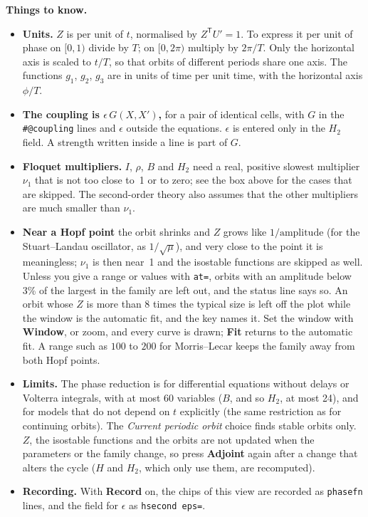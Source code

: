 \documentclass[11pt,a4paper]{article}
\newcommand{\ui}[1]{\textsf{\textbf{#1}}}          %
\begin{document}
\begin{notebox}
\textbf{Things to know.}
\begin{itemize}
  \item \textbf{Units.} $Z$ is per unit of $t$, normalised by $Z^{\mathsf T}U'=1$. To express it per unit of phase on $[0,1)$ divide by $T$; on $[0,2\pi)$ multiply by $2\pi/T$. Only the horizontal axis is scaled to $t/T$, so that orbits of different periods share one axis. The functions $g_1$, $g_2$, $g_3$ are in units of time per unit time, with the horizontal axis $\phi/T$.
  \item \textbf{The coupling is $\epsilon\,G(X,X')$,} for a pair of identical cells, with $G$ in the \texttt{\#@coupling} lines and $\epsilon$ outside the equations. $\epsilon$ is entered only in the $H_2$ field. A strength written inside a line is part of $G$.
  \item \textbf{Floquet multipliers.} $I$, $\rho$, $B$ and $H_2$ need a real, positive slowest multiplier $\nu_1$ that is not too close to~1 or to zero; see the box above for the cases that are skipped. The second-order theory also assumes that the other multipliers are much smaller than $\nu_1$.
  \item \textbf{Near a Hopf point} the orbit shrinks and $Z$ grows like $1/\text{amplitude}$ (for the Stuart--Landau oscillator, as $1/\sqrt\mu$), and very close to the point it is meaningless; $\nu_1$ is then near~1 and the isostable functions are skipped as well. Unless you give a range or values with \texttt{at=}, orbits with an amplitude below 3\% of the largest in the family are left out, and the status line says so. An orbit whose $Z$ is more than 8 times the typical size is left off the plot while the window is the automatic fit, and the key names it. Set the window with \ui{Window}, or zoom, and every curve is drawn; \ui{Fit} returns to the automatic fit. A range such as $100$ to $200$ for Morris--Lecar keeps the family away from both Hopf points.
  \item \textbf{Limits.} The phase reduction is for differential equations without delays or Volterra integrals, with at most 60 variables ($B$, and so $H_2$, at most 24), and for models that do not depend on $t$ explicitly (the same restriction as for continuing orbits). The \emph{Current periodic orbit} choice finds stable orbits only. $Z$, the isostable functions and the orbits are not updated when the parameters or the family change, so press \ui{Adjoint} again after a change that alters the cycle ($H$ and $H_2$, which only use them, are recomputed).
  \item \textbf{Recording.} With \ui{Record} on, the chips of this view are recorded as \texttt{phasefn} lines, and the field for $\epsilon$ as \texttt{hsecond eps=}.
\end{itemize}
\end{notebox}
\end{document}

